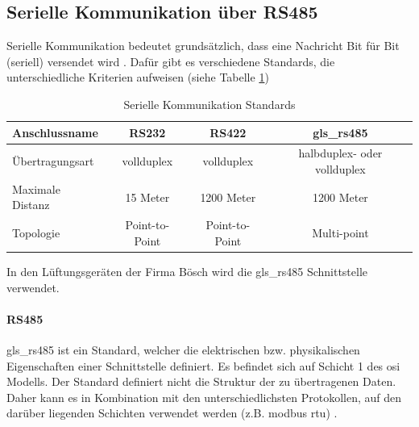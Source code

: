 \subsection{Serielle Kommunikation über RS485}
Serielle Kommunikation bedeutet grundsätzlich, dass eine Nachricht Bit für Bit (seriell) versendet wird \cite{Schnabel:o.J.}. Dafür gibt es verschiedene Standards, die unterschiedliche Kriterien aufweisen (siehe Tabelle \ref{tab:serielle}) 
\begin{table}[H]
	\caption{Serielle Kommunikation Standards \label{tab:serielle}}
	\begin{tabularx}{\textwidth}{@{}X|c|c|c@{}}
		\toprule
		\textbf{Anschlussname} & \textbf{RS232} & \textbf{RS422} & \textbf{\gls{gls_rs485}}\\
		\midrule
		Übertragungsart & \gls{vollduplex} & \gls{vollduplex} & \gls{halbduplex}- oder \gls{vollduplex} \\
		Maximale Distanz & 15 Meter & 1200 Meter & 1200 Meter \\
		Topologie & Point-to-Point & Point-to-Point & Multi-point \\
		\bottomrule
	\end{tabularx}
\end{table}
\cite{IPC2U_GmbH_SerielleSchnittstellen:o.J.}

In den Lüftungsgeräten der Firma Bösch wird die \gls{gls_rs485} Schnittstelle verwendet.

\paragraph{RS485} \label{rs485}
\gls{gls_rs485} ist ein Standard, welcher die elektrischen bzw. physikalischen Eigenschaften einer Schnittstelle definiert. Es befindet sich auf Schicht 1 des \gls{osi} Modells. Der Standard definiert nicht die Struktur der zu übertragenen Daten. Daher kann es in Kombination mit den unterschiedlichsten Protokollen, auf den darüber liegenden Schichten verwendet werden (z.B. \gls{modbus}  \acs{rtu}) \cite{Janitza:o.J.}.

